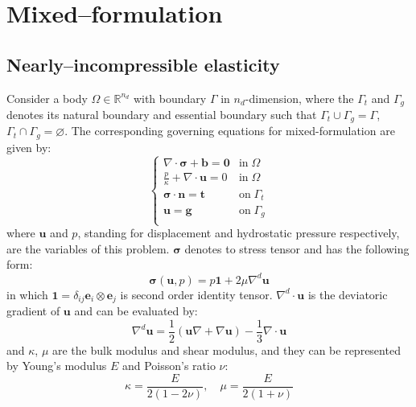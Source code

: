 \section{Mixed--formulation}
\subsection{Nearly--incompressible elasticity}
Consider a body $\Omega \in \mathbb R^{n_d}$ with boundary $\Gamma$ in $n_d$-dimension, where the $\Gamma_t$ and $\Gamma_g$ denotes its natural boundary and essential boundary such that $\Gamma_t \cup \Gamma_g = \Gamma$, $\Gamma_t \cap \Gamma_g = \varnothing$. The corresponding governing equations for mixed-formulation are given by:
\begin{equation}\label{strong}
\begin{cases}
    \nabla \cdot \boldsymbol \sigma + \boldsymbol b = \boldsymbol 0 & \mathrm{in} \; \Omega \\
    \frac{p}{\kappa} + \nabla \cdot \boldsymbol u = 0 & \mathrm{in} \; \Omega \\
    \boldsymbol \sigma \cdot \boldsymbol n = \boldsymbol t & \mathrm{on} \; \Gamma_t \\
    \boldsymbol u = \boldsymbol g & \mathrm{on} \; \Gamma_g \\
\end{cases}
\end{equation}
where $\boldsymbol u$ and $p$, standing for displacement and hydrostatic pressure respectively, are the variables of this problem. $\boldsymbol \sigma$ denotes to stress tensor and has the following form: 
\begin{equation}\label{stress}
    \boldsymbol \sigma(\boldsymbol u, p) = p \boldsymbol 1 + 2\mu \nabla^d \boldsymbol u
\end{equation}
in which $\boldsymbol 1 = \delta_{ij} \boldsymbol e_i \otimes \boldsymbol e_j$ is second order identity tensor.
$\nabla^d \cdot \boldsymbol u$ is the deviatoric gradient of $\boldsymbol u$ and can be evaluated by:
\begin{equation}
\nabla^d \boldsymbol u = \frac{1}{2}(\boldsymbol u \nabla + \nabla \boldsymbol u) - \frac{1}{3} \nabla \cdot \boldsymbol u
\end{equation}
and $\kappa$, $\mu$ are the bulk modulus and shear modulus, and they can be represented by Young's modulus $E$ and Poisson's ratio $\nu$:
\begin{equation}\label{modulus}
\kappa = \frac{E}{2(1-2\nu)}, \quad \mu = \frac{E}{2(1+\nu)}
\end{equation}

